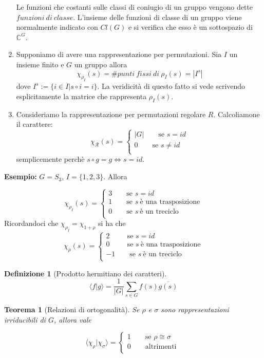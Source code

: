 \documentclass[11pt]{article}
\theoremstyle{plain}
\newtheorem{thm}{Teorema}[section]
\theoremstyle{definition}
\newtheorem{defn}{Definizione}[section]
\theoremstyle{remark}
\newcommand{\dsum}{\displaystyle\sum}
\begin{document}
\begin{enumerate}
Le funzioni che costanti sulle classi di coniugio di un gruppo vengono dette $funzioni\ di\ classe$. L'insieme delle funzioni di classe di un gruppo viene normalmente indicato con $Cl(G)$ e si verifica che esso è un sottospazio di $\mathbb{C}^G$.
	\item Supponiamo di avere una rappresentazione per permutazioni. Sia $I$ un insieme finito e $G$ un gruppo allora 
$$\chi_{\rho_{I}}(s)=\#punti\ fissi\ di\ \rho_I(s)=|I^s|$$
dove $I^s:=\{i\in I| s\circ i=i\}$. La veridicità di questo fatto si vede scrivendo esplicitamente la matrice che rappresenta $\rho_I(s)$.
	\item Consideriamo la rappresentazione per permutazioni regolare $R$. Calcoliamone il carattere:
	\[ \chi_{\mathcal{R}}(s) = \begin{cases}
|G| \qquad \text{se } s=id \\
0 \qquad \text{se } s\neq id\\
\end{cases} \]
semplicemente perchè $s\circ g=g\Leftrightarrow s=id$.
\end{enumerate}
\textbf{Esempio:} $G=S_3$, $I=\{1,2,3\}$. Allora

\[ \chi_{\rho_I}(s) = \begin{cases}
3 \qquad \text{se } s=id \\
1 \qquad \text{se } s\ \text{è una trasposizione}\\
0 \qquad \text{se } s\ \text{è un treciclo}\\
\end{cases} \]
Ricordandoci che $\chi_{\rho_I}=\chi_{1+\rho}$ si ha che 
\[ \chi_{\rho}(s) = \begin{cases}
2 \qquad \ \ \text{se } s=id \\
0 \qquad \ \ \text{se } s\ \text{è una trasposizione}\\
-1\qquad \text{se } s\ \text{è un treciclo}\\
\end{cases} \]

\begin{defn}[Prodotto hermitiano dei caratteri]

\[ \langle f | g \rangle = \dfrac{1}{|G|} \dsum_{s \in G} f(s)\overline{ g(s)} \]

\end{defn}


\begin{thm}[Relazioni di ortogonalità]
Se $\rho$ e $\sigma$ sono rappresentazioni irriducibili di $G$, allora vale

\[\langle \chi_{\rho}|\chi_{\sigma} \rangle = \begin{cases}
1 \qquad \text{se } \rho \cong \sigma \\
0 \qquad \text{altrimenti }\\
\end{cases} \]
\label{relazione di ortogonalita}
\end{thm}
\end{document}
